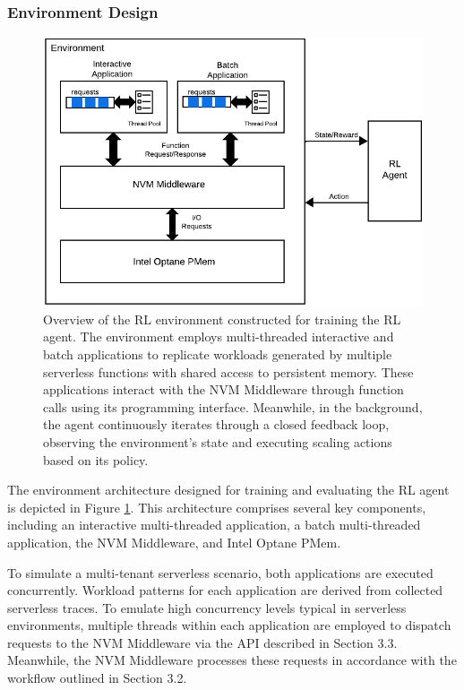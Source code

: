 \subsubsection{Environment Design}

\begin{figure}[ht]
  \centering
  \includegraphics[width=1\textwidth]{images/rl_environment_architecture.png}
  \caption[Overview of the Reinforcement Learning Environment]{Overview of the RL environment constructed for training the RL agent. The environment employs multi-threaded interactive and batch applications to replicate workloads generated by multiple serverless functions with shared access to persistent memory. These applications interact with the NVM Middleware through function calls using its programming interface. Meanwhile, in the background, the agent continuously iterates through a closed feedback loop, observing the environment's state and executing scaling actions based on its policy.}
  \label{fig:rl_environment_architecture}
\end{figure}

The environment architecture designed for training and evaluating the RL agent is depicted in Figure \ref{fig:rl_environment_architecture}. This architecture comprises several key components, including an interactive multi-threaded application, a batch multi-threaded application, the NVM Middleware, and Intel Optane PMem.

To simulate a multi-tenant serverless scenario, both applications are executed concurrently. Workload patterns for each application are derived from collected serverless traces. To emulate high concurrency levels typical in serverless environments, multiple threads within each application are employed to dispatch requests to the NVM Middleware via the API described in Section 3.3. Meanwhile, the NVM Middleware processes these requests in accordance with the workflow outlined in Section 3.2.

